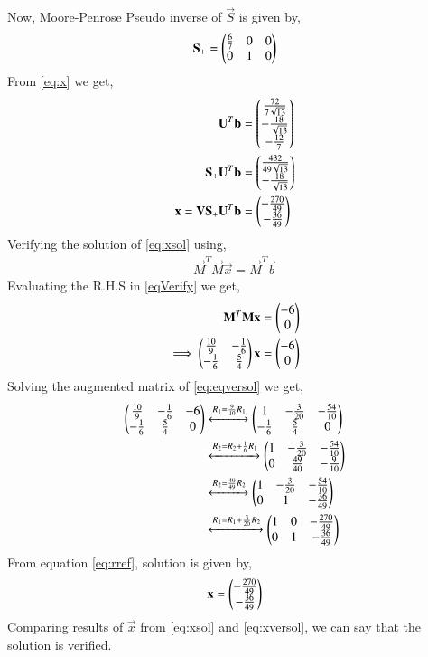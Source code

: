 \documentclass[journal,12pt,twocolumn]{IEEEtran}
\begin{document}
Now, Moore-Penrose Pseudo inverse of $\vec{S}$ is given by,
\begin{align}
\mathbf{S_+} = \begin{pmatrix}\frac{6}{7}&0&0\\0&1&0\end{pmatrix}
\end{align}
From \eqref{eq:x} we get,
\begin{align}
\mathbf{U}^T\mathbf{b}&=\begin{pmatrix}\frac{72}{7\sqrt{13}}\\-\frac{18}{\sqrt{13}}\\-\frac{12}{7}\end{pmatrix}\\
\mathbf{S_+}\mathbf{U}^T\mathbf{b}&=\begin{pmatrix}\frac{432}{49\sqrt{13}}\\-\frac{18}{\sqrt{13}}\end{pmatrix}\\
\mathbf{x} = \mathbf{V}\mathbf{S_+}\mathbf{U}^T\mathbf{b} &= \begin{pmatrix}-\frac{270}{49}\\-\frac{36}{49}\end{pmatrix} \label{eq:xsol}
\end{align}
Verifying the solution of \eqref{eq:xsol} using,
\begin{align}
\vec{M}^T\vec{M}\vec{x} = \vec{M}^T\vec{b}\label{eqVerify}
\end{align}
Evaluating the R.H.S in \eqref{eqVerify} we get,
\begin{align}
\mathbf{M}^T\mathbf{M}\mathbf{x} &= \begin{pmatrix}-6\\0\end{pmatrix}\\
\implies\begin{pmatrix}\frac{10}{9}&-\frac{1}{6}\\-\frac{1}{6}&\frac{5}{4}\end{pmatrix}\mathbf{x} &= \begin{pmatrix}-6\\0\end{pmatrix}\label{eq:eqversol}
\end{align}
Solving the augmented matrix of \eqref{eq:eqversol} we get,
\begin{align}
\begin{pmatrix}\frac{10}{9}&-\frac{1}{6}&-6\\-\frac{1}{6}&\frac{5}{4}&0\end{pmatrix} &\xleftrightarrow{R_1=\frac{9}{10}R_1}\begin{pmatrix}1&-\frac{3}{20}&-\frac{54}{10}\\-\frac{1}{6}&\frac{5}{4}&0\end{pmatrix}\\
&\xleftrightarrow{R_2=R_2+\frac{1}{6}R_1}\begin{pmatrix}1&-\frac{3}{20}&-\frac{54}{10}\\0&\frac{49}{40}&-\frac{9}{10}\end{pmatrix}\\
&\xleftrightarrow{R_2=\frac{40}{49}R_2}\begin{pmatrix}1&-\frac{3}{20}&-\frac{54}{10}\\0&1&-\frac{36}{49}\end{pmatrix}\\
&\xleftrightarrow{R_1=R_1+\frac{3}{20}R_2}\begin{pmatrix}1&0&-\frac{270}{49}\\0&1&-\frac{36}{49}\end{pmatrix}\label{eq:rref}
\end{align}
From equation \eqref{eq:rref}, solution is given by,
\begin{align}
\mathbf{x}=\begin{pmatrix}-\frac{270}{49}\\-\frac{36}{49}\end{pmatrix}\label{eq:xversol}
\end{align}
Comparing results of $\vec{x}$ from \eqref{eq:xsol} and \eqref{eq:xversol}, we can say that the solution is verified.
\end{document}
